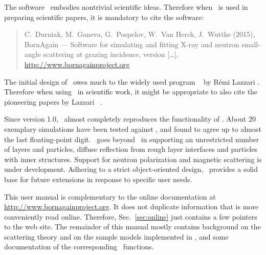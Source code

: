 The software \BornAgain\ embodies nontrivial scientific ideas.
Therefore when \BornAgain\ is used in preparing scientific papers,
it is mandatory to cite the software:
%
\begin{quote}
C.~Durniak, M.~Ganeva, G.~Pospelov, W.~Van Herck, J.~Wuttke (2015),\newline
BornAgain --- Software for simulating and fitting
X-ray and neutron small-angle scattering at grazing incidence,
version [\ldots],\newline
\url{http://www.bornagainproject.org}
\end{quote}
The initial design of \BornAgain\ owes much
to the widely used program \IsGISAXS\
%
%
by R\'emi Lazzari \cite{Laz02,Laz08}.
Therefore when using \BornAgain\ in scientific work,
it might be appropriate to also cite the pioneering papers
by Lazzari \etal\ \cite{Laz02,ReLL09}.

Since version 1.0, \BornAgain\
almost completely reproduces the functionality
of \IsGISAXS.
About 20 exemplary simulations have been tested against \IsGISAXS,
and found to agree up to almost the last floating-point digit.
\BornAgain\ goes beyond \IsGISAXS\
in supporting an unrestricted number of layers and particles,
diffuse reflection from rough layer interfaces and
particles with inner structures.
Support for neutron polarization and magnetic scattering
is under development.
Adhering to a strict object-oriented design,
\BornAgain\ provides a solid base for future extensions
in response to specific user needs.



This user manual is complementary to the online documentation
at \url{http://www.bornagainproject.org}.
It does not duplicate information that is more conveniently read online.
Therefore, Sec.~\ref{sec:online} just contains a few pointers to the web site.
The remainder of this manual mostly contains background
on the scattering theory and on the sample models implemented in \BornAgain,
and some documentation of the corresponding \Python\ functions.

